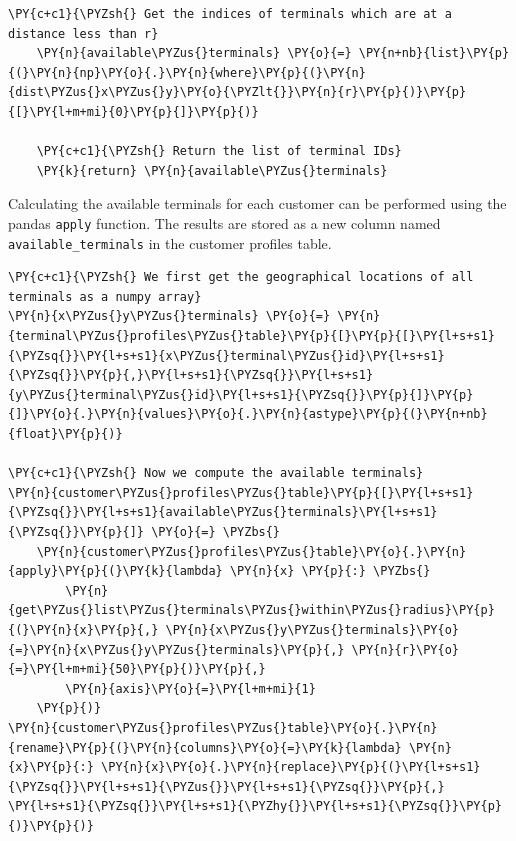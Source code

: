 \begin{tcolorbox}[breakable, size=fbox, boxrule=1pt, pad at break*=1mm,colback=cellbackground, colframe=cellborder]
\begin{Verbatim}[commandchars=\\\{\}]
    \PY{c+c1}{\PYZsh{} Get the indices of terminals which are at a distance less than r}
    \PY{n}{available\PYZus{}terminals} \PY{o}{=} \PY{n+nb}{list}\PY{p}{(}\PY{n}{np}\PY{o}{.}\PY{n}{where}\PY{p}{(}\PY{n}{dist\PYZus{}x\PYZus{}y}\PY{o}{\PYZlt{}}\PY{n}{r}\PY{p}{)}\PY{p}{[}\PY{l+m+mi}{0}\PY{p}{]}\PY{p}{)}

    \PY{c+c1}{\PYZsh{} Return the list of terminal IDs}
    \PY{k}{return} \PY{n}{available\PYZus{}terminals}
\end{Verbatim}
\end{tcolorbox}

    Calculating the available terminals for each customer can be performed
using the pandas \texttt{apply} function. The results are stored as a
new column named \texttt{available\_terminals} in the customer profiles
table.

    \begin{tcolorbox}[breakable, size=fbox, boxrule=1pt, pad at break*=1mm,colback=cellbackground, colframe=cellborder]
\begin{Verbatim}[commandchars=\\\{\}]
\PY{c+c1}{\PYZsh{} We first get the geographical locations of all terminals as a numpy array}
\PY{n}{x\PYZus{}y\PYZus{}terminals} \PY{o}{=} \PY{n}{terminal\PYZus{}profiles\PYZus{}table}\PY{p}{[}\PY{p}{[}\PY{l+s+s1}{\PYZsq{}}\PY{l+s+s1}{x\PYZus{}terminal\PYZus{}id}\PY{l+s+s1}{\PYZsq{}}\PY{p}{,}\PY{l+s+s1}{\PYZsq{}}\PY{l+s+s1}{y\PYZus{}terminal\PYZus{}id}\PY{l+s+s1}{\PYZsq{}}\PY{p}{]}\PY{p}{]}\PY{o}{.}\PY{n}{values}\PY{o}{.}\PY{n}{astype}\PY{p}{(}\PY{n+nb}{float}\PY{p}{)}

\PY{c+c1}{\PYZsh{} Now we compute the available terminals}
\PY{n}{customer\PYZus{}profiles\PYZus{}table}\PY{p}{[}\PY{l+s+s1}{\PYZsq{}}\PY{l+s+s1}{available\PYZus{}terminals}\PY{l+s+s1}{\PYZsq{}}\PY{p}{]} \PY{o}{=} \PYZbs{}
    \PY{n}{customer\PYZus{}profiles\PYZus{}table}\PY{o}{.}\PY{n}{apply}\PY{p}{(}\PY{k}{lambda} \PY{n}{x} \PY{p}{:} \PYZbs{}
        \PY{n}{get\PYZus{}list\PYZus{}terminals\PYZus{}within\PYZus{}radius}\PY{p}{(}\PY{n}{x}\PY{p}{,} \PY{n}{x\PYZus{}y\PYZus{}terminals}\PY{o}{=}\PY{n}{x\PYZus{}y\PYZus{}terminals}\PY{p}{,} \PY{n}{r}\PY{o}{=}\PY{l+m+mi}{50}\PY{p}{)}\PY{p}{,}
        \PY{n}{axis}\PY{o}{=}\PY{l+m+mi}{1}
    \PY{p}{)}
\PY{n}{customer\PYZus{}profiles\PYZus{}table}\PY{o}{.}\PY{n}{rename}\PY{p}{(}\PY{n}{columns}\PY{o}{=}\PY{k}{lambda} \PY{n}{x}\PY{p}{:} \PY{n}{x}\PY{o}{.}\PY{n}{replace}\PY{p}{(}\PY{l+s+s1}{\PYZsq{}}\PY{l+s+s1}{\PYZus{}}\PY{l+s+s1}{\PYZsq{}}\PY{p}{,} \PY{l+s+s1}{\PYZsq{}}\PY{l+s+s1}{\PYZhy{}}\PY{l+s+s1}{\PYZsq{}}\PY{p}{)}\PY{p}{)}
\end{Verbatim}
\end{tcolorbox}
 
